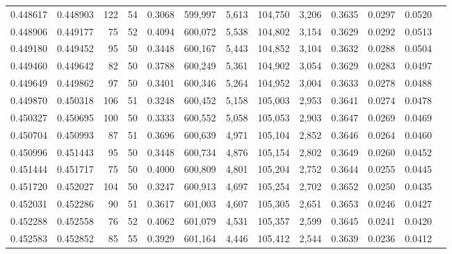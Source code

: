\begin{tabular}{rrrrrrrrrrrrr}
0.448617 & 0.448903 &   122 &  54 &                                     0.3068 & 599,997 &   5,613 & 104,750 &   3,206 & 0.3635 & 0.0297 & 0.0520 \\
0.448906 & 0.449177 &    75 &  52 &                                     0.4094 & 600,072 &   5,538 & 104,802 &   3,154 & 0.3629 & 0.0292 & 0.0513 \\
0.449180 & 0.449452 &    95 &  50 &                                     0.3448 & 600,167 &   5,443 & 104,852 &   3,104 & 0.3632 & 0.0288 & 0.0504 \\
0.449460 & 0.449642 &    82 &  50 &                                     0.3788 & 600,249 &   5,361 & 104,902 &   3,054 & 0.3629 & 0.0283 & 0.0497 \\
0.449649 & 0.449862 &    97 &  50 &                                     0.3401 & 600,346 &   5,264 & 104,952 &   3,004 & 0.3633 & 0.0278 & 0.0488 \\
0.449870 & 0.450318 &   106 &  51 &                                     0.3248 & 600,452 &   5,158 & 105,003 &   2,953 & 0.3641 & 0.0274 & 0.0478 \\
0.450327 & 0.450695 &   100 &  50 &                                     0.3333 & 600,552 &   5,058 & 105,053 &   2,903 & 0.3647 & 0.0269 & 0.0469 \\
0.450704 & 0.450993 &    87 &  51 &                                     0.3696 & 600,639 &   4,971 & 105,104 &   2,852 & 0.3646 & 0.0264 & 0.0460 \\
0.450996 & 0.451443 &    95 &  50 &                                     0.3448 & 600,734 &   4,876 & 105,154 &   2,802 & 0.3649 & 0.0260 & 0.0452 \\
0.451444 & 0.451717 &    75 &  50 &                                     0.4000 & 600,809 &   4,801 & 105,204 &   2,752 & 0.3644 & 0.0255 & 0.0445 \\
0.451720 & 0.452027 &   104 &  50 &                                     0.3247 & 600,913 &   4,697 & 105,254 &   2,702 & 0.3652 & 0.0250 & 0.0435 \\
0.452031 & 0.452286 &    90 &  51 &                                     0.3617 & 601,003 &   4,607 & 105,305 &   2,651 & 0.3653 & 0.0246 & 0.0427 \\
0.452288 & 0.452558 &    76 &  52 &                                     0.4062 & 601,079 &   4,531 & 105,357 &   2,599 & 0.3645 & 0.0241 & 0.0420 \\
0.452583 & 0.452852 &    85 &  55 &                                     0.3929 & 601,164 &   4,446 & 105,412 &   2,544 & 0.3639 & 0.0236 & 0.0412 \\

\end{tabular}

